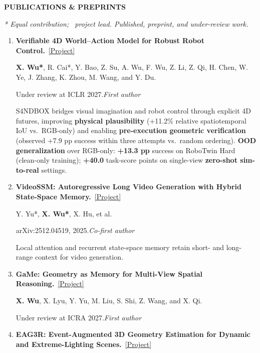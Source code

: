 \documentclass[a4paper]{article}
\newcommand{\cvsection}[1]{%
  \par\vspace{2.0pt}%
  {\color{cvblue}\fontsize{11}{12.2}\selectfont\bfseries\MakeUppercase{#1}}\par
  \vspace{-4pt}{\color{cvblue}\rule{\textwidth}{0.4pt}}\par\vspace{1.0pt}%
}
\newcommand{\pubgroup}[1]{%
  \par\vspace{2.0pt}{\color{cvblue}\fontsize{9.4}{10.4}\selectfont\bfseries #1}\par
}
\newcommand{\pubnote}[1]{\par{\color{cvgray}#1}}
\begin{document}
\cvsection{Publications \& Preprints}
{\fontsize{9}{9.65}\selectfont
\textit{* Equal contribution; \textdagger\ project lead. Published, preprint, and under-review work.}\par
\pubgroup{First- and Co-first-author Work}
\begin{enumerate}[leftmargin=1.6em,labelsep=0.38em,itemsep=0.4pt,topsep=1.3pt,parsep=0pt,partopsep=0pt]
\item \textbf{Verifiable 4D World--Action Model for Robust Robot Control.}~\href{https://candy-crusher.github.io/xiaoshanwu.github.io/projects/sandbox/}{\textcolor{cvblue}{[Project]}}\par
\textbf{X. Wu*}, R. Cai*, Y. Bao, Z. Su, A. Wu, F. Wu, Z. Li, Z. Qi, H. Chen, W. Ye, J. Zhang, K. Zhou, M. Wang, and Y. Du.\par
Under review at ICLR 2027.\hfill\textcolor{cvblue}{\textit{First author}}
\pubnote{S4NDBOX bridges visual imagination and robot control through explicit 4D futures, improving \textbf{physical plausibility} (+11.2\% relative spatiotemporal IoU vs.\ RGB-only) and enabling \textbf{pre-execution geometric verification} (observed +7.9 pp success within three attempts vs.\ random ordering).} \textbf{OOD generalization} over RGB-only: \textbf{+13.3 pp} success on RoboTwin Hard (clean-only training); \textbf{+40.0} task-score points on single-view \textbf{zero-shot sim-to-real} settings.
\item \textbf{VideoSSM: Autoregressive Long Video Generation with Hybrid State-Space Memory.}~\href{https://candy-crusher.github.io/xiaoshanwu.github.io/projects/videossm/}{\textcolor{cvblue}{[Project]}}\par
Y. Yu*, \textbf{X. Wu*}, X. Hu, et al.\par
arXiv:2512.04519, 2025.\hfill\textcolor{cvblue}{\textit{Co-first author}}
\pubnote{Local attention and recurrent state-space memory retain short- and long-range context for video generation.}
\item \textbf{GaMe: Geometry as Memory for Multi-View Spatial Reasoning.}~\href{https://candy-crusher.github.io/xiaoshanwu.github.io/projects/game/}{\textcolor{cvblue}{[Project]}}\par
\textbf{X. Wu}, X. Lyu, Y. Yu, M. Liu, S. Shi, Z. Wang, and X. Qi.\par
Under review at ICRA 2027.\hfill\textcolor{cvblue}{\textit{First author}}
\item \textbf{EAG3R: Event-Augmented 3D Geometry Estimation for Dynamic and Extreme-Lighting Scenes.}~\href{https://candy-crusher.github.io/xiaoshanwu.github.io/projects/eag3r/}{\textcolor{cvblue}{[Project]}}\par

\end{enumerate}}
\end{document}
